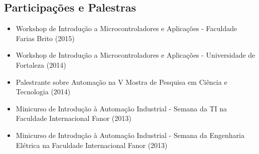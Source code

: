 \documentclass[11pt,a4paper,sans]{moderncv}
\begin{document}
\begin{samepage}
	\section{Participações e Palestras}
	\begin{itemize}[itemsep=0cm, leftmargin=0.6cm, label={\textbullet}]
		\item Workshop de Introdução a Microcontroladores e Aplicações - Faculdade Farias Brito (2015)
		\item Workshop de Introdução a Microcontroladores e Aplicações - Universidade de Fortaleza (2014)
		\item Palestrante sobre Automação na V Mostra de Pesquisa em Ciência e Tecnologia (2014)
		\item Minicurso de Introdução à Automação Industrial - Semana da TI na Faculdade Internacional Fanor (2013)
		\item Minicurso de Introdução à Automação Industrial - Semana da Engenharia Elétrica na Faculdade Internacional Fanor (2013)
	\end{itemize}
\end{samepage}
\vspace{\baselineskip}

\fancyfoot{} %
\end{document}
